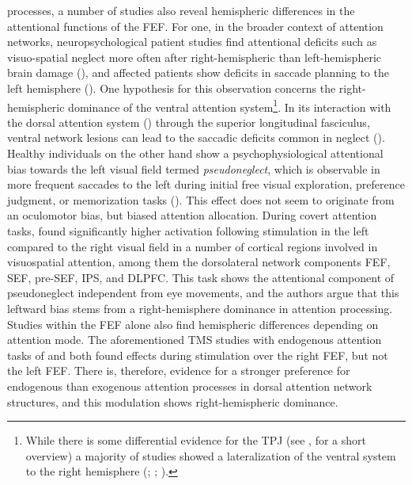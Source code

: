 \documentclass[a4paper, 12pt]{scrreprt}
\begin{document}
processes, a number of studies also reveal hemispheric differences in the attentional functions of the FEF. For one, in the broader context of attention networks, neuropsychological patient studies find attentional deficits such as visuo-spatial neglect more often after right-hemispheric than left-hemispheric brain damage (\cite{vernet2014corrigendum}), and affected patients show deficits in saccade planning to the left hemisphere (\cite{Behrmann2001ImpairedIB}). One hypothesis for this observation concerns the right-hemispheric dominance of the ventral attention system\footnote{While there is some differential evidence for the TPJ (see \textcite{vossel2014dorsal}, for a short overview) a majority of studies showed a lateralization of the ventral system to the right hemisphere (\cite{corbetta2002control}; \cite{fox2006spontaneous}; \cite{corbetta2008reorienting}).}. In its interaction with the dorsal attention system (\cite{he2007breakdown}) through the superior longitudinal fasciculus, ventral network lesions can lead to the saccadic deficits common in neglect (\cite{friston2018neglect}). Healthy individuals on the other hand show a psychophysiological attentional bias towards the left visual field termed \textit{pseudoneglect}, which is observable in more frequent saccades to the left during initial free visual exploration, preference judgment, or memorization tasks (\cite{nuthmann2014time}). This effect does not seem to originate from an oculomotor bias, but biased attention allocation. During covert attention tasks, \textcite{siman2007bihemispheric} found significantly higher activation following stimulation in the left compared to the right visual field in a number of cortical regions involved in visuospatial attention, among them the dorsolateral network components FEF, SEF, pre-SEF, IPS, and DLPFC. This task shows the attentional component of pseudoneglect independent from eye movements, and the authors argue that this leftward bias stems from a right-hemisphere dominance in attention processing. Studies within the FEF alone also find hemispheric differences depending on attention mode. The aforementioned TMS studies with endogenous attention tasks of \textcite{muggleton2003human} and \textcite{grosbras2002transcranial} both found effects during stimulation over the right FEF, but not the left FEF. There is, therefore, evidence for a stronger preference for endogenous than exogenous attention processes in dorsal attention network structures, and this modulation shows right-hemispheric dominance. \newline
\end{document}
